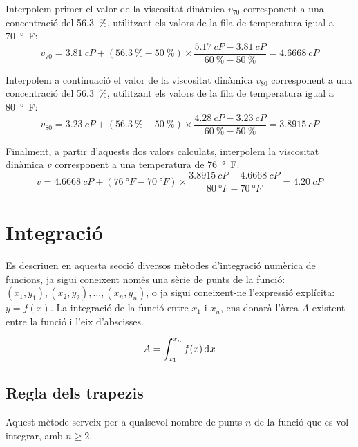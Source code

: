 \begin{exemple}
    Interpolem primer el valor de la viscositat dinàmica $v_{70}$ corresponent a una concentració del \qty{56,3}{\percent}, utilitzant els valors de la fila de temperatura igual a  \qty{70}{\degree F}:
    \[
         v_{70}=\qty{3,81}{cP}+(\qty{56,3}{\percent}-\qty{50}{\percent})\times
         \frac{\qty{5,17}{cP}-\qty{3,81}{cP}}{\qty{60}{\percent}-\qty{50}{\percent}}=\qty{4,6668}{cP}
    \]

    Interpolem a continuació el valor de la viscositat dinàmica $v_{80}$ corresponent a una concentració del \qty{56,3}{\percent}, utilitzant els valors de la fila de temperatura igual a  \qty{80}{\degree F}:
    \[
         v_{80} =\qty{3,23}{cP}+(\qty{56,3}{\percent}-\qty{50}{\percent})\times
         \frac{\qty{4,28}{cP}-\qty{3,23}{cP}}{\qty{60}{\percent}-\qty{50}{\percent}}=\qty{3,8915}{cP}
    \]

    Finalment, a partir d'aquests dos valors calculats, interpolem la viscositat dinàmica $v$ corresponent  a una temperatura de
    \qty{76}{\degree F}.
    \[
         v =\qty{4,6668}{cP}+(\qty{76}{\degree F}-\qty{70}{\degree F})\times
         \frac{\qty{3,8915}{cP}-\qty{4,6668}{cP}}{\qty{80}{\degree F}-\qty{70}{\degree F}}=\qty{4,20}{cP}
    \]

\end{exemple}

\section{Integració}\label{sec:int-mum}

Es descriuen en aquesta secció diversos mètodes d'integració numèrica de funcions, ja sigui coneixent només una sèrie de punts de la funció: $(x_1, y_1), (x_2, y_2), \dots ,(x_n, y_n)$, o ja sigui coneixent-ne l'expressió explícita: $y=f(x)$. La integració de la funció entre $x_1$ i $x_n$, ens donarà l'àrea $A$ existent entre la funció i l'eix d'abscisses.

 \begin{equation}
    A = \int_{x_1}^{x_n} f(x) \diff x
 \end{equation}

\subsection{Regla dels trapezis}

Aquest mètode serveix per a qualsevol nombre de punts $n$ de la funció que es vol integrar, amb $n \geq 2$.

